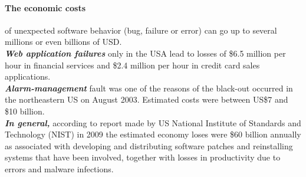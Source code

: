 \paragraph{The economic costs} of unexpected software behavior (bug, failure or error) can go up to several millions or even billions of USD. \\
\textit{\textbf{Web application failures}} only in the USA lead to losses of \$6.5 million per hour in financial services and \$2.4 million per hour in credit card sales applications\cite{Lecture1}. \\
\textit{\textbf{Alarm-management}} fault was one of the reasons of the black-out occurred in the northeastern US on August 2003. Estimated costs were between US\$7 and \$10 billion\cite{costOfErrors}.\\
\textit{\textbf{In general,}} according to report made by US National Institute of Standards and Technology (NIST) in 2009 the estimated economy loses  were \$60 billion annually as associated with developing and distributing software patches and reinstalling systems that have been involved, together with losses in productivity due to errors and malware infections\cite{costOfErrors}.\\








